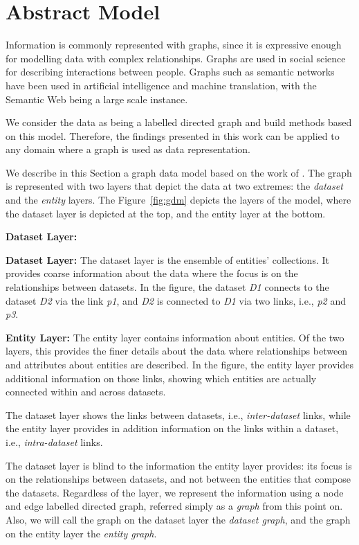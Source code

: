 \section{Abstract Model}
\label{chap:ssd:gdm:abstract-model}

Information is commonly represented with graphs, since it is expressive enough for modelling data with complex relationships. Graphs are used in social science for describing interactions between people. Graphs such as semantic networks~\cite{sowa2006semantic} have been used in artificial intelligence and machine translation, with the Semantic Web being a large scale instance.

We consider the data as being a labelled directed graph and build methods based on this model. Therefore, the findings presented in this work can be applied to any domain where a graph is used as data representation.

We describe in this Section a graph data model based on the work of \cite{delbru:jws:entity}. The graph is represented with two layers that depict the data at two extremes: the \emph{dataset} and the \emph{entity} layers. The Figure~\ref{fig:gdm} depicts the layers of the model, where the dataset layer is depicted at the top, and the entity layer at the bottom.
\begin{labeling}{\textbf{Dataset Layer:}}
	\item[\textbf{Dataset Layer:}] The dataset layer is the ensemble of entities' collections. It provides coarse information about the data where the focus is on the relationships between datasets. In the figure, the dataset \emph{D1} connects to the dataset \emph{D2} via the link \emph{p1}, and \emph{D2} is connected to \emph{D1} via two links, i.e., \emph{p2} and \emph{p3}.
	\item[\textbf{Entity Layer:}] The entity layer contains information about entities. Of the two layers, this provides the finer details about the data where relationships between and attributes about entities are described. In the figure, the entity layer provides additional information on those links, showing which entities are actually connected within and across datasets. 
\end{labeling}

The dataset layer shows the links between datasets, i.e., \emph{inter-dataset} links, while the entity layer provides in addition information on the links within a dataset, i.e., \emph{intra-dataset} links.

The dataset layer is blind to the information the entity layer provides: its focus is on the relationships between datasets, and not between the entities that compose the datasets.
Regardless of the layer, we represent the information using a node and edge labelled directed graph, referred simply as a \emph{graph} from this point on. Also, we will call the graph on the dataset layer the \emph{dataset graph}, and the graph on the entity layer the \emph{entity graph}.


